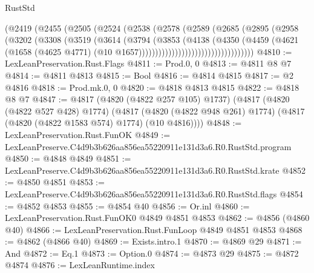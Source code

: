 \begin{lexlean}{RustStd}
\begin{coremodule}
                              (@2419
                                (@2455
                                  (@2505
                                    (@2524
                                      (@2538
                                        (@2578
                                          (@2589
                                            (@2685
                                              (@2895
                                                (@2958
                                                  (@3202
                                                    (@3308
                                                      (@3519
                                                        (@3614
                                                          (@3794
                                                            (@3853
                                                              (@4138
                                                                (@4350
                                                                  (@4459
                                                                    (@4621
                                                                      (@1658
                                                                        (@4625 @4771)
                                                                        (@10
                                                                          @1657)))))))))))))))))))))))))))))))))))
@4810 := LexLeanPreservation.Rust.Flags
@4811 := Prod.{0, 0}
@4813 := @4811 @8 @7
@4814 := @4811 @4813
@4815 := Bool
@4816 := @4814 @4815
@4817 := @2 @4816
@4818 := Prod.mk.{0, 0}
@4820 := @4818 @4813 @4815
@4822 := @4818 @8 @7
@4847 := @4817
    (@4820 (@4822 @257 @105) @1737)
    (@4817
      (@4820 (@4822 @527 @428) @1774)
      (@4817 (@4820 (@4822 @948 @261) @1774) (@4817 (@4820 (@4822 @1583 @574) @1774) (@10 @4816))))
@4848 := LexLeanPreservation.Rust.FunOK
@4849 := LexLeanPreserve.C4d9b3b626aa856ea55220911e131d3a6.R0.RustStd.program
@4850 := @4848 @4849
@4851 := LexLeanPreserve.C4d9b3b626aa856ea55220911e131d3a6.R0.RustStd.krate
@4852 := @4850 @4851
@4853 := LexLeanPreserve.C4d9b3b626aa856ea55220911e131d3a6.R0.RustStd.flags
@4854 := @4852 @4853
@4855 := @4854 @40
@4856 := Or.inl
@4860 := LexLeanPreservation.Rust.FunOK0 @4849 @4851 @4853
@4862 := @4856 (@4860 @40)
@4866 := LexLeanPreservation.Rust.FunLoop @4849 @4851 @4853
@4868 := @4862 (@4866 @40)
@4869 := Exists.intro.{1}
@4870 := @4869 @29
@4871 := And
@4872 := Eq.{1}
@4873 := Option.{0}
@4874 := @4873 @29
@4875 := @4872 @4874
@4876 := LexLeanRuntime.index

\end{coremodule}
\end{lexlean}
